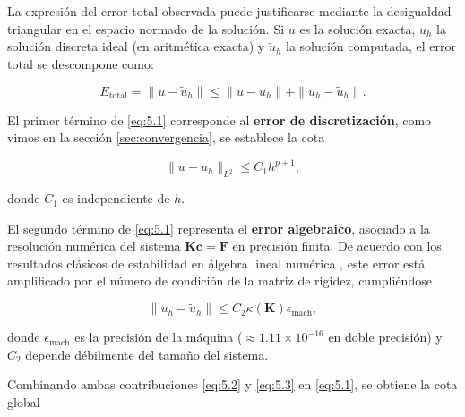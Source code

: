 \documentclass[11pt]{book}
\theoremstyle{plain} %
\theoremstyle{definition} %
\theoremstyle{definition} %
\begin{document}
La expresión del error total observada puede justificarse mediante la desigualdad triangular en el espacio normado de la solución. Si $u$ es la solución exacta, $u_h$ la solución discreta ideal (en aritmética exacta) y $\widetilde{u}_h$ la solución computada, el error total se descompone como:

\vspace{-0.5cm}

\begin{equation}\label{eq:5.1}
    E_{\text{total}} = \|u - \widetilde{u}_h\| \le \|u - u_h\| + \|u_h - \widetilde{u}_h\|.
\end{equation}

\vspace{-0.2cm}

El primer término de \eqref{eq:5.1} corresponde al \textbf{error de discretización}, como vimos en la sección \ref{sec:convergencia}, se establece la cota

\vspace{-0.5cm}

\begin{equation}\label{eq:5.2}
    \|u - u_h\|_{L^2} \le C_1 h^{p+1},
\end{equation}

\vspace{-0.2cm}
\noindent
donde $C_1$ es independiente de $h$.

El segundo término de \eqref{eq:5.1} representa el \textbf{error algebraico}, asociado a la resolución numérica del sistema $\mathbf{K}\mathbf{c} = \mathbf{F}$ en precisión finita. De acuerdo con los resultados clásicos de estabilidad en álgebra lineal numérica \cite{higham_accuracy_2002}, este error está amplificado por el número de condición de la matriz de rigidez, cumpliéndose

\vspace{-0.5cm}

\begin{equation}\label{eq:5.3}
    \|u_h - \widetilde{u}_h\| \le C_2 \kappa(\mathbf{K}) \epsilon_{\text{mach}},
\end{equation}

\vspace{-0.2cm}
\noindent
donde $\epsilon_{\text{mach}}$ es la precisión de la máquina ($\approx 1.11 \times 10^{-16}$ en doble precisión) y $C_2$ depende débilmente del tamaño del sistema.

Combinando ambas contribuciones \eqref{eq:5.2} y \eqref{eq:5.3} en \eqref{eq:5.1}, se obtiene la cota global
\end{document}
